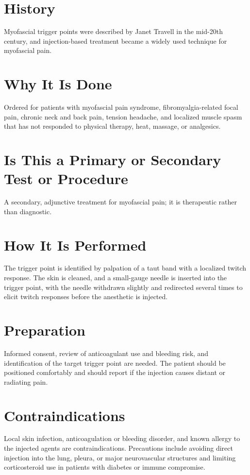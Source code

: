 \section*{History}
Myofascial trigger points were described by Janet Travell in the mid-20th century, and injection-based treatment became a widely used technique for myofascial pain.

\section*{Why It Is Done}
Ordered for patients with myofascial pain syndrome, fibromyalgia-related focal pain, chronic neck and back pain, tension headache, and localized muscle spasm that has not responded to physical therapy, heat, massage, or analgesics.

\section*{Is This a Primary or Secondary Test or Procedure}
A secondary, adjunctive treatment for myofascial pain; it is therapeutic rather than diagnostic.

\section*{How It Is Performed}
The trigger point is identified by palpation of a taut band with a localized twitch response. The skin is cleaned, and a small-gauge needle is inserted into the trigger point, with the needle withdrawn slightly and redirected several times to elicit twitch responses before the anesthetic is injected.

\section*{Preparation}
Informed consent, review of anticoagulant use and bleeding risk, and identification of the target trigger point are needed. The patient should be positioned comfortably and should report if the injection causes distant or radiating pain.

\section*{Contraindications}
Local skin infection, anticoagulation or bleeding disorder, and known allergy to the injected agents are contraindications. Precautions include avoiding direct injection into the lung, pleura, or major neurovascular structures and limiting corticosteroid use in patients with diabetes or immune compromise.

